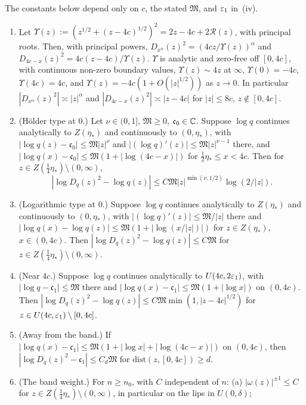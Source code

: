 \begin{lemma}\label{lem:szego}
The constants below depend only on $c$, the stated $\mathfrak M$, and $\varepsilon_1$ in~(iv).
\begin{enumerate}
\item[(i)] Let $\Upsilon(z):=(z^{1/2}+(z-4c)^{1/2})^2=2z-4c+2\mathcal R(z)$, with principal roots. Then, with principal
  powers, $D_{x^\alpha}(z)^2=(4cz/\Upsilon(z))^\alpha$ and $D_{4c-x}(z)^2=4c(z-4c)/\Upsilon(z)$. $\Upsilon$ is analytic and
  zero-free off $[0,4c]$, with continuous non-zero boundary values, $\Upsilon(z)\sim4z$ at $\infty$, $\Upsilon(0)=-4c$,
  $\Upsilon(4c)=4c$, and $\Upsilon(z)=-4c(1+O(|z|^{1/2}))$ as $z\to0$. In particular $|D_{x^\alpha}(z)^2|\asymp|z|^\alpha$ and
  $|D_{4c-x}(z)^2|\asymp|z-4c|$ for $|z|\le8c$, $z\notin[0,4c]$.
\item[(ii)] (H\"older type at $0$.) Let $\nu\in(0,1]$, $\mathfrak M\ge0$, $\mathfrak c_0\in\mathbb{C}$. Suppose $\log q$ continues analytically to
  $Z(\eta_*)$ and continuously to $(0,\eta_*)$, with $|\log q(z)-\mathfrak c_0|\le\mathfrak M|z|^\nu$ and $|(\log q)'(z)|\le\mathfrak M|z|^{\nu-1}$
  there, and $|\log q(x)-\mathfrak c_0|\le\mathfrak M(1+|\log(4c-x)|)$ for $\frac12\eta_*\le x<4c$. Then for
  $z\in Z(\frac14\eta_*)\setminus(0,\infty)$,
  \[
    |\log D_q(z)^2-\log q(z)|\le C\mathfrak M|z|^{\min(\nu,1/2)}\log(2/|z|).
  \]
\item[(iii)] (Logarithmic type at $0$.) Suppose $\log q$ continues analytically to $Z(\eta_*)$ and continuously to
  $(0,\eta_*)$, with $|(\log q)'(z)|\le\mathfrak M/|z|$ there and $|\log q(x)-\log q(z)|\le\mathfrak M(1+|\log(x/|z|)|)$ for $z\in Z(\eta_*)$,
  $x\in(0,4c)$. Then $|\log D_q(z)^2-\log q(z)|\le C\mathfrak M$ for $z\in Z(\frac14\eta_*)\setminus(0,\infty)$.
\item[(iv)] (Near $4c$.) Suppose $\log q$ continues analytically to $U(4c,2\varepsilon_1)$, with $|\log q-\mathfrak c_1|\le\mathfrak M$ there and
  $|\log q(x)-\mathfrak c_1|\le\mathfrak M(1+|\log x|)$ on $(0,4c)$. Then $|\log D_q(z)^2-\log q(z)|\le C\mathfrak M\min(1,|z-4c|^{1/2})$ for
  $z\in U(4c,\varepsilon_1)\setminus[0,4c]$.
\item[(v)] (Away from the band.) If $|\log q(x)-\mathfrak c_1|\le\mathfrak M(1+|\log x|+|\log(4c-x)|)$ on $(0,4c)$, then
  $|\log D_q(z)^2-\mathfrak c_1|\le C_d\mathfrak M$ for $\mathrm{dist}(z,[0,4c])\ge d$.
\item[(vi)] (The band weight.) For $n\ge n_0$, with $C$ independent of $n$:
(a) $|\omega(z)|^{\pm1}\le C$ for $z\in Z(\frac14\eta_*)\setminus(0,\infty)$, in particular on the lips in $U(0,\delta)$;

\end{enumerate}
\end{lemma}
